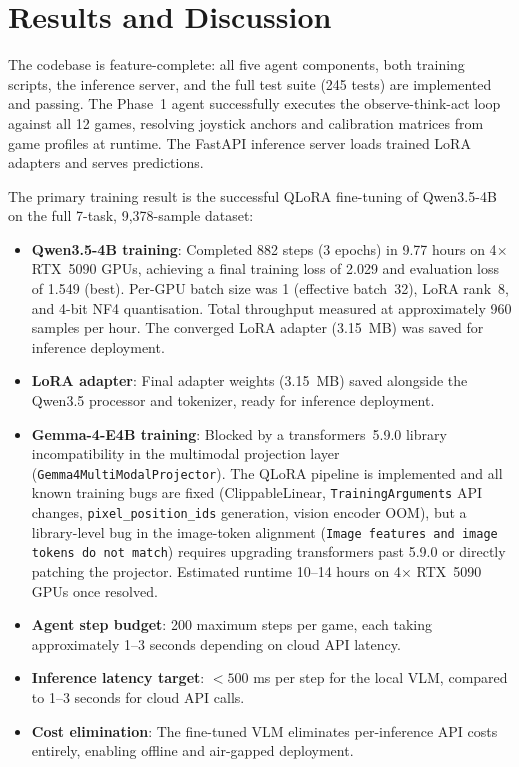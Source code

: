 \documentclass[11pt,a4paper]{article}
\begin{document}
\section{Results and Discussion}

The codebase is feature-complete: all five agent components, both training scripts, the inference server, and the full test suite (245 tests) are implemented and passing. The Phase~1 agent successfully executes the observe-think-act loop against all 12 games, resolving joystick anchors and calibration matrices from game profiles at runtime. The FastAPI inference server loads trained LoRA adapters and serves predictions.

The primary training result is the successful QLoRA fine-tuning of Qwen3.5-4B on the full 7-task, 9,378-sample dataset:

\begin{itemize}[leftmargin=*,itemsep=2pt]
  \item \textbf{Qwen3.5-4B training}: Completed 882 steps (3 epochs) in 9.77 hours on 4$\times$ RTX~5090 GPUs, achieving a final training loss of 2.029 and evaluation loss of 1.549 (best). Per-GPU batch size was 1 (effective batch~32), LoRA rank~8, and 4-bit NF4 quantisation. Total throughput measured at approximately 960 samples per hour. The converged LoRA adapter (3.15~MB) was saved for inference deployment.
  \item \textbf{LoRA adapter}: Final adapter weights (3.15~MB) saved alongside the Qwen3.5 processor and tokenizer, ready for inference deployment.
  \item \textbf{Gemma-4-E4B training}: Blocked by a transformers~5.9.0 library incompatibility in the multimodal projection layer (\texttt{Gemma4MultiModalProjector}). The QLoRA pipeline is implemented and all known training bugs are fixed (ClippableLinear, \texttt{TrainingArguments} API changes, \texttt{pixel\_position\_ids} generation, vision encoder OOM), but a library-level bug in the image-token alignment (\texttt{Image features and image tokens do not match}) requires upgrading transformers past 5.9.0 or directly patching the projector. Estimated runtime 10--14 hours on 4$\times$ RTX~5090 GPUs once resolved.
  \item \textbf{Agent step budget}: 200 maximum steps per game, each taking approximately 1--3 seconds depending on cloud API latency.
  \item \textbf{Inference latency target}: $< 500$ ms per step for the local VLM, compared to 1--3 seconds for cloud API calls.
  \item \textbf{Cost elimination}: The fine-tuned VLM eliminates per-inference API costs entirely, enabling offline and air-gapped deployment.
\end{itemize}
\end{document}
